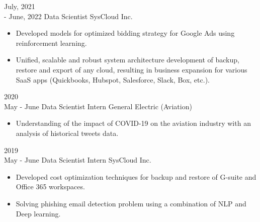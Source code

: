\documentclass[11pt]{developercv} %
\begin{document}
\begin{entrylist}
{    }
    \entry
    {July, 2021\\- June, 2022}
    {Data Scientist}
    {SysCloud Inc.}
    {\vspace{-7pt}\small
        \begin{itemize}[noitemsep,topsep=0pt,parsep=0pt,partopsep=0pt, leftmargin=10pt]
            \item Developed models for optimized bidding strategy for Google Ads using reinforcement learning.
            \item Unified, scalable and robust system architecture development of backup, restore and export of any cloud, resulting in business expansion for various SaaS apps (Quickbooks, Hubspot, Salesforce, Slack, Box, etc.).
        \end{itemize}
    }
    \entry
    {2020\\\footnotesize{May - June}}
    {Data Scientist Intern}
    {General Electric (Aviation)}
    {\vspace{-7pt}\small
        \begin{itemize}[noitemsep,topsep=0pt,parsep=0pt,partopsep=0pt, leftmargin=10pt]
            \item Understanding of the impact of COVID-19 on the aviation industry with an analysis of historical tweets data.
        \end{itemize}
    }
    \entry
    {2019\\\footnotesize{May - June}}
    {Data Scientist Intern}
    {SysCloud Inc.}
    {\vspace{-7pt}
    \small
        \begin{itemize}[noitemsep,topsep=0pt,parsep=0pt,partopsep=0pt, leftmargin=10pt]
            \item Developed cost optimization techniques for backup and restore of G-suite and Office 365 workspaces.
            \item Solving phishing email detection problem using a combination of NLP and Deep learning.
        \end{itemize}
    }
\end{entrylist}




\end{document}
